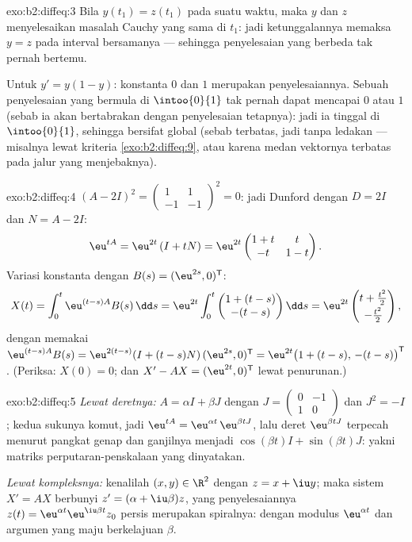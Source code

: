 \begin{solution}{exo:b2:diffeq:3}
Bila $y(t_1) = z(t_1)$ pada suatu waktu, maka $y$ dan $z$ menyelesaikan masalah
Cauchy yang sama di $t_1$: jadi ketunggalannya memaksa $y = z$ pada interval
bersamanya --- sehingga penyelesaian yang berbeda tak pernah bertemu.

Untuk $y' = y(1-y)$: konstanta $0$ dan $1$ merupakan penyelesaiannya. Sebuah
penyelesaian yang bermula di $\intoo{0}{1}$ tak pernah dapat mencapai $0$ atau $1$
(sebab ia akan bertabrakan dengan penyelesaian tetapnya): jadi ia tinggal di
$\intoo{0}{1}$, sehingga bersifat global (sebab terbatas, jadi tanpa ledakan --- misalnya
lewat kriteria \cref{exo:b2:diffeq:9}, atau karena medan vektornya
terbatas pada jalur yang menjebaknya).
\end{solution}

\begin{solution}{exo:b2:diffeq:4}
$(A - 2I)^2 = \begin{pmatrix}1 & 1\\ -1 & -1\end{pmatrix}^2 = 0$: jadi
Dunford dengan $D = 2I$ dan $N = A - 2I$:
\[
\eu^{tA} = \eu^{2t}\,(I + tN)
= \eu^{2t}\begin{pmatrix} 1 + t & t\\ -t & 1 - t\end{pmatrix}.
\]
Variasi konstanta dengan $B(s) = (\eu^{2s}, 0)^{\mathsf T}$:
\[
X(t) = \int_0^t \eu^{(t-s)A}B(s)\,\dd s
= \eu^{2t}\int_0^t \begin{pmatrix} 1 + (t-s)\\ -(t-s)
\end{pmatrix}\dd s
= \eu^{2t}\begin{pmatrix} t + \frac{t^2}{2}\\[2pt] -\frac{t^2}{2}
\end{pmatrix},
\]
dengan memakai $\eu^{(t-s)A}B(s) = \eu^{2(t-s)}(I + (t-s)N)\,(\eu^{2s},
0)^{\mathsf T} = \eu^{2t}\bigl(1 + (t-s),\, -(t-s)\bigr)^{\mathsf
T}$. (Periksa: $X(0) = 0$; dan $X' - AX = (\eu^{2t}, 0)^{\mathsf T}$
lewat penurunan.)
\end{solution}

\begin{solution}{exo:b2:diffeq:5}
\emph{Lewat deretnya:} $A = \alpha I + \beta J$ dengan $J =
\begin{pmatrix}0 & -1\\ 1 & 0\end{pmatrix}$ dan $J^2 = -I$; kedua
sukunya komut, jadi $\eu^{tA} = \eu^{\alpha t}\,\eu^{\beta tJ}$,
lalu deret $\eu^{\beta t J}$ terpecah menurut pangkat genap dan ganjilnya
menjadi $\cos(\beta t)I + \sin(\beta t)J$: yakni matriks perputaran-penskalaan
yang dinyatakan.

\emph{Lewat kompleksnya:} kenalilah $(x, y) \in \R^2$ dengan $z = x + \iu y$;
maka sistem $X' = AX$ berbunyi $z' = (\alpha + \iu\beta)z$, yang
penyelesaiannya $z(t) = \eu^{\alpha t}\eu^{\iu\beta t}z_0$ persis merupakan
spiralnya: dengan modulus $\eu^{\alpha t}$ dan argumen yang maju berkelajuan
$\beta$.
\end{solution}

